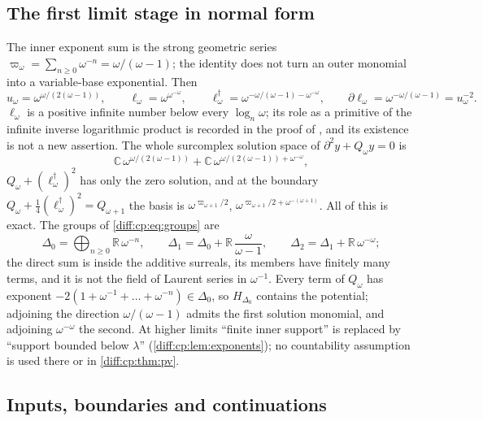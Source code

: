 \documentclass[11pt,letterpaper]{article}
\numberwithin{equation}{section}
\theoremstyle{definition}
\theoremstyle{remark}
\newcommand{\R}{\mathbb R}
\newcommand{\C}{\mathbb C}
\newcommand{\der}{\partial}
\begin{document}
\subsection{The first limit stage in normal form}
\label{diff:cp:sub:omega}

\begin{example}[$\lambda=\omega$]
\label{diff:cp:ex:omega}
The inner exponent sum is the strong geometric series
$\varpi_{\omega}=\sum_{n\geq0}\omega^{-n}=\omega/(\omega-1)$; the identity does
not turn an outer monomial into a variable-base exponential. Then
\[
 u_{\omega}=\omega^{\omega/(2(\omega-1))},\qquad
 \ell_{\omega}=\omega^{\omega^{-\omega}},\qquad
 \ell_{\omega}^{\dagger}=\omega^{-\omega/(\omega-1)-\omega^{-\omega}},\qquad
 \der\ell_{\omega}=\omega^{-\omega/(\omega-1)}=u_{\omega}^{-2}.
\]
$\ell_{\omega}$ is a positive infinite number below every $\log_{n}\omega$; its
role as a primitive of the infinite inverse logarithmic product is recorded in
the proof of \cite[Theorem~8.4]{BMGerms}, and its existence is not a new
assertion. The whole surcomplex solution space of $\der^{2}y+Q_{\omega}y=0$ is
\[
 \C\,\omega^{\omega/(2(\omega-1))}+\C\,\omega^{\omega/(2(\omega-1))+\omega^{-\omega}},
\]
$Q_{\omega}+(\ell_{\omega}^{\dagger})^{2}$ has only the zero solution, and at
the boundary $Q_{\omega}+\frac14(\ell_{\omega}^{\dagger})^{2}=Q_{\omega+1}$ the
basis is $\omega^{\varpi_{\omega+1}/2}$,
$\omega^{\varpi_{\omega+1}/2+\omega^{-(\omega+1)}}$. All of this is exact. The
groups of \cref{diff:cp:eq:groups} are
\[
 \Delta_{0}=\bigoplus_{n\geq0}\R\,\omega^{-n},\qquad
 \Delta_{1}=\Delta_{0}+\R\,\frac{\omega}{\omega-1},\qquad
 \Delta_{2}=\Delta_{1}+\R\,\omega^{-\omega};
\]
the direct sum is inside the additive surreals, its members have finitely
many terms, and it is not the field of Laurent series in $\omega^{-1}$. Every
term of $Q_{\omega}$ has exponent $-2(1+\omega^{-1}+\dots+\omega^{-n})\in\Delta_{0}$,
so $H_{\Delta_{0}}$ contains the potential; adjoining the direction
$\omega/(\omega-1)$ admits the first solution monomial, and adjoining
$\omega^{-\omega}$ the second. At higher limits ``finite inner support'' is
replaced by ``support bounded below $\lambda$'' (\cref{diff:cp:lem:exponents});
no countability assumption is used there or in \cref{diff:cp:thm:pv}.
\end{example}

\subsection{Inputs, boundaries and continuations}
\label{diff:cp:sub:limits}
\end{document}
